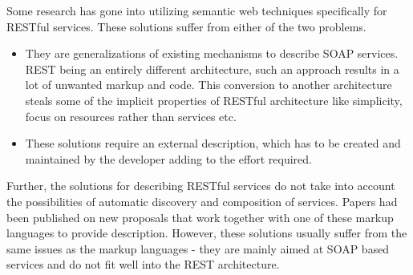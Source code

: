 \begin{spacing}{1.5}
Some research has gone into utilizing semantic web techniques specifically for RESTful services. These solutions suffer from either of the two problems. 

\begin{itemize}
\item They are generalizations of existing mechanisms to describe SOAP services. REST being an entirely different architecture, such an approach results in a lot of unwanted markup and code. This conversion to another architecture steals some of the implicit properties of RESTful architecture like simplicity, focus on resources rather than services etc.
\item These solutions require an external description, which has to be created and maintained by the developer adding to the effort required. 
\end{itemize}

Further, the solutions for describing RESTful services do not take into account the possibilities of automatic discovery and composition of services. Papers had been published on new proposals that work together with one of these markup languages to provide description. However, these solutions usually suffer from the same issues as the markup languages - they are mainly aimed at SOAP based services and do not fit well into the REST architecture.
\end{spacing}